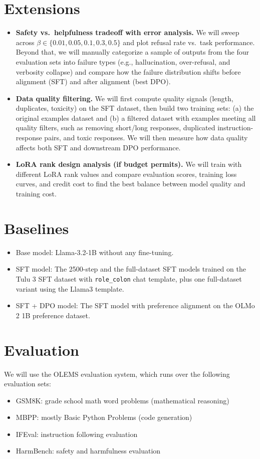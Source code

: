 \documentclass[11pt]{article}
\begin{document}
\section{Extensions}
\begin{itemize}
    \item \textbf{Safety vs.~helpfulness tradeoff with error analysis.}
    We will sweep across $\beta \in \{0.01, 0.05, 0.1, 0.3, 0.5\}$ and plot refusal rate vs.~task performance. Beyond that, we will manually categorize a sample of outputs from the four evaluation sets into failure types (e.g., hallucination, over-refusal, and verbosity collapse) and compare how the failure distribution shifts before alignment (SFT) and after alignment (best DPO).

    \item \textbf{Data quality filtering.}
    We will first compute quality signals (length, duplicates, toxicity) on the SFT dataset, then build two training sets: (a) the original examples dataset and (b) a filtered dataset with examples meeting all quality filters, such as removing short/long responses, duplicated instruction-response pairs, and toxic responses. We will then measure how data quality affects both SFT and downstream DPO performance.

    \item \textbf{LoRA rank design analysis (if budget permits).}
    We will train with different LoRA rank values and compare evaluation scores, training loss curves, and credit cost to find the best balance between model quality and training cost.
\end{itemize}

\section{Baselines}
\begin{itemize}
  \item Base model: Llama-3.2-1B without any fine-tuning.
  \item SFT model: The 2500-step and the full-dataset SFT models trained on the Tulu 3 SFT dataset with \texttt{role\_colon} chat template, plus one full-dataset variant using the Llama3 template.
  \item SFT + DPO model: The SFT model with preference alignment on the OLMo 2 1B preference dataset.
\end{itemize}

\section{Evaluation}
We will use the OLEMS evaluation system, which runs over the following evaluation sets: 
\begin{itemize}
  \item GSM8K: grade school math word problems (mathematical reasoning)
  \item MBPP: mostly Basic Python Problems (code generation)
  \item IFEval: instruction following evaluation
  \item HarmBench: safety and harmfulness evaluation
\end{itemize}
\end{document}
